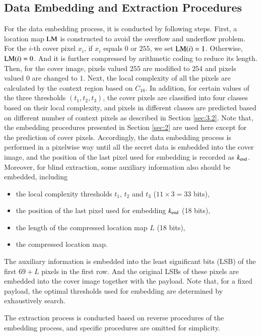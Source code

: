 \documentclass[review,3p,10pt,sort&compress]{elsarticle}
\begin{document}
\subsection{Data Embedding and Extraction Procedures}\label{sec:3.3}
For the data embedding process, it is conducted by following steps. First, a location map $ \rm LM$ is constructed to avoid the overflow and underflow problem. For the $i$-th cover pixel $x_i$, if $x_i$ equals 0 or $255$, we set ${\rm LM}(i) = 1$. Otherwise, ${\rm LM}(i) = 0$. And it is further compressed by arithmetic coding to reduce its length. Then, for the cover image, pixels valued $255$ are modified to $254$ and pixels valued $0$ are changed to $1$. Next, the local complexity of all the pixels are calculated by the context region based on $C_{18}$. In addition, for certain values of the three thresholds $(t_1, t_2, t_3)$, the cover pixels are classified into four classes based on their local complexity, and pixels in different classes are predicted based on different number of context pixels as described in Section \ref{sec:3.2}. Note that, the embedding procedures presented in Section \ref{sec:2} are used here except for the prediction of cover pixels. Accordingly, the data embedding process is performed in a pixelwise way until all the secret data is embedded into the cover image, and the position of the last pixel used for embedding is recorded as $k_{\rm end}$. Moreover, for blind extraction, some auxiliary information also should be embedded, including
\begin{itemize}
  \item the local complexity thresholds $t_1$, $t_2$ and $t_3$ ($11 \times 3 = 33$ bits),
  \item the position of the last pixel used for embedding $k_{\rm end}$ (18 bits),
  \item the length of the compressed location map $L$ (18 bits),
  \item the compressed location map.
\end{itemize}
The auxiliary information is embedded into the least significant bits (LSB) of the first $69 + L$ pixels in the first row. And the original LSBs of these pixels are embedded into the cover image together with the payload.
Note that, for a fixed payload, the optimal thresholds used for embedding are determined by exhaustively search.

The extraction process is conducted based on reverse procedures of the embedding process, and specific procedures are omitted for simplicity.
\end{document}
